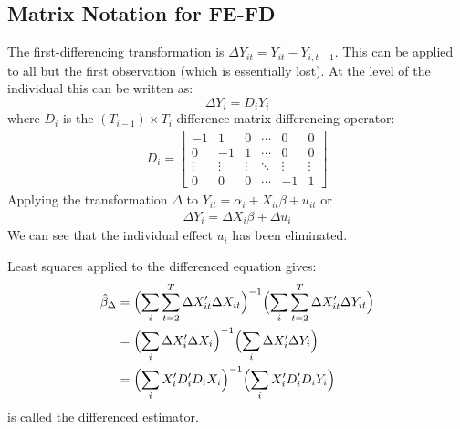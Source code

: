 \subsection*{Matrix Notation for FE-FD}
The first-differencing transformation is $\Delta Y_{it} = Y_{it} - Y_{i,t-1}.$
This can be applied to all but the first observation (which is essentially lost).
At the level of the individual this can be written as:
\[\Delta Y_i = D_i Y_i\]
where $D_i$ is the $(T_{i-1}) \times T_i$ difference matrix differencing operator:
\begin{gather*}
    D_i = \begin{bmatrix}
        -1 & 1 & 0 & \cdots & 0 & 0\\
        0 & -1 & 1 & \cdots & 0 & 0\\
        \vdots & \vdots & \vdots & \ddots & \vdots & \vdots\\
        0 & 0 & 0 & \cdots & -1 & 1
    \end{bmatrix}
\end{gather*}
Applying the transformation $\Delta$ to $Y_{it} = \alpha_i + X_{it} \beta + u_{it}$ or
\begin{gather*}
    \Delta Y_i = \Delta X_i \beta + \Delta u_i 
\end{gather*}
We can see that the individual effect $u_i$ has been eliminated.

Least squares applied to the differenced equation gives:
\begin{align*}
    \hat{\beta}_{\Delta} &= \Bigl( \sum_{i} \sum_{t=2}^{T} \Delta X_{it}^{\prime} \Delta X_{it}  \Bigr)^{-1} \Bigl( \sum_{i} \sum_{t=2}^{T} \Delta X_{it}^{\prime} \Delta Y_{it} \Bigr) \\
                &= \Bigl( \sum_{i} \Delta X_i^{\prime} \Delta X_i \Bigr)^{-1} \Bigl( \sum_{i} \Delta X_i^{\prime} \Delta Y_i \Bigr) \\
                &= \Bigl( \sum_{i} X_i^{\prime} D_i^{\prime} D_i X_i \Bigr)^{-1} \Bigl( \sum_{i} X_i^{\prime} D_i^{\prime} D_i Y_i \Bigr)
\end{align*}
is called the differenced estimator.

